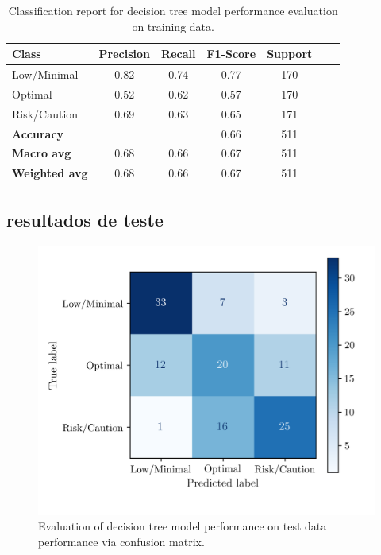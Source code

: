 \documentclass[conference]{IEEEtran}
\begin{document}
\begin{table}[H]
\centering
\caption{Classification report for decision tree model performance evaluation on training data.}
\begin{tabular}{lcccccc}
\toprule
\textbf{Class} & \textbf{Precision} & \textbf{Recall} & \textbf{F1-Score} & \textbf{Support} \\
\midrule
Low/Minimal & 0.82 & 0.74 & 0.77 & 170 \\
Optimal & 0.52 & 0.62 & 0.57 & 170 \\
Risk/Caution & 0.69 & 0.63 & 0.65 & 171 \\
\midrule
\textbf{Accuracy} &  &  & 0.66 & 511 \\
\textbf{Macro avg} & 0.68 & 0.66 & 0.67 & 511 \\
\textbf{Weighted avg} & 0.68 & 0.66 & 0.67 & 511 \\
\bottomrule
\end{tabular}
\end{table}

\subsection{resultados de teste}

\begin{figure}[H]
    \centering
    \includegraphics[width=1\linewidth]{assets/DTREE_ConfusionMatrixTest.png}
    \caption{Evaluation of decision tree model performance on test data performance via confusion matrix.}
    \label{dtree_cmtest}
\end{figure}
\end{document}
